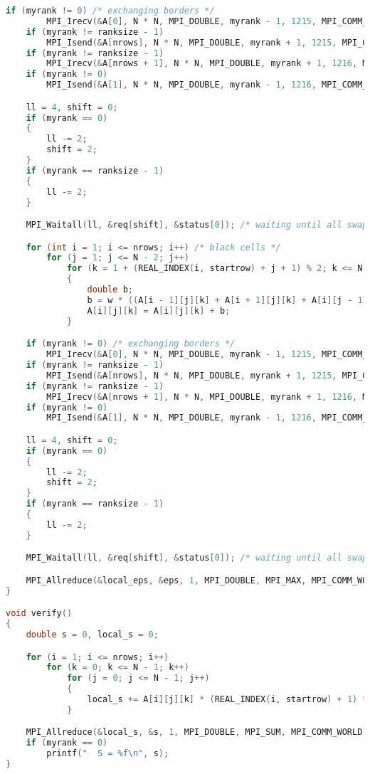 \begin{lstlisting}[language=c++]
	if (myrank != 0) /* exchanging borders */
		MPI_Irecv(&A[0], N * N, MPI_DOUBLE, myrank - 1, 1215, MPI_COMM_WORLD, &req[0]);
	if (myrank != ranksize - 1)
		MPI_Isend(&A[nrows], N * N, MPI_DOUBLE, myrank + 1, 1215, MPI_COMM_WORLD, &req[2]);
	if (myrank != ranksize - 1)
		MPI_Irecv(&A[nrows + 1], N * N, MPI_DOUBLE, myrank + 1, 1216, MPI_COMM_WORLD, &req[3]);
	if (myrank != 0)
		MPI_Isend(&A[1], N * N, MPI_DOUBLE, myrank - 1, 1216, MPI_COMM_WORLD, &req[1]);

	ll = 4, shift = 0;
	if (myrank == 0)
	{
		ll -= 2;
		shift = 2;
	}
	if (myrank == ranksize - 1)
	{
		ll -= 2;
	}

	MPI_Waitall(ll, &req[shift], &status[0]); /* waiting until all swaps will be done */

	for (int i = 1; i <= nrows; i++) /* black cells */
		for (j = 1; j <= N - 2; j++)
			for (k = 1 + (REAL_INDEX(i, startrow) + j + 1) % 2; k <= N - 2; k += 2)
			{
				double b;
				b = w * ((A[i - 1][j][k] + A[i + 1][j][k] + A[i][j - 1][k] + A[i][j + 1][k] + A[i][j][k - 1] + A[i][j][k + 1]) / 6. - A[i][j][k]);
				A[i][j][k] = A[i][j][k] + b;
			}

	if (myrank != 0) /* exchanging borders */
		MPI_Irecv(&A[0], N * N, MPI_DOUBLE, myrank - 1, 1215, MPI_COMM_WORLD, &req[0]);
	if (myrank != ranksize - 1)
		MPI_Isend(&A[nrows], N * N, MPI_DOUBLE, myrank + 1, 1215, MPI_COMM_WORLD, &req[2]);
	if (myrank != ranksize - 1)
		MPI_Irecv(&A[nrows + 1], N * N, MPI_DOUBLE, myrank + 1, 1216, MPI_COMM_WORLD, &req[3]);
	if (myrank != 0)
		MPI_Isend(&A[1], N * N, MPI_DOUBLE, myrank - 1, 1216, MPI_COMM_WORLD, &req[1]);

	ll = 4, shift = 0;
	if (myrank == 0)
	{
		ll -= 2;
		shift = 2;
	}
	if (myrank == ranksize - 1)
	{
		ll -= 2;
	}

	MPI_Waitall(ll, &req[shift], &status[0]); /* waiting until all swaps will be done */

	MPI_Allreduce(&local_eps, &eps, 1, MPI_DOUBLE, MPI_MAX, MPI_COMM_WORLD); /* updating global eps */
}

void verify()
{
	double s = 0, local_s = 0;

	for (i = 1; i <= nrows; i++)
		for (k = 0; k <= N - 1; k++)
			for (j = 0; j <= N - 1; j++)
			{
				local_s += A[i][j][k] * (REAL_INDEX(i, startrow) + 1) * (j + 1) * (k + 1) / (N * N * N);
			}

	MPI_Allreduce(&local_s, &s, 1, MPI_DOUBLE, MPI_SUM, MPI_COMM_WORLD); /* updating global eps */
	if (myrank == 0)
		printf("  S = %f\n", s);
}
\end{lstlisting}

